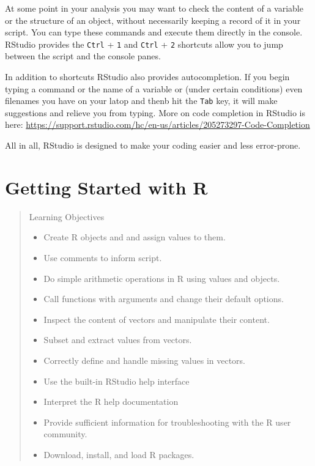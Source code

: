 \documentclass[
]{book}
\providecommand{\tightlist}{%
  \setlength{\itemsep}{0pt}\setlength{\parskip}{0pt}}
\begin{document}
At some point in your analysis you may want to check the content of a variable
or the structure of an object, without necessarily keeping a record of it in
your script. You can type these commands and execute them directly in the
console. RStudio provides the \texttt{Ctrl} + \texttt{1} and
\texttt{Ctrl} + \texttt{2} shortcuts allow you to jump between the
script and the console panes.

In addition to shortcuts RStudio also provides autocompletion. If you begin typing a command or the name of a variable or (under certain conditions) even filenames you have on your latop and thenb hit the \texttt{Tab} key, it will make suggestions and relieve you from typing. More on code completion in RStudio is here: \url{https://support.rstudio.com/hc/en-us/articles/205273297-Code-Completion}

All in all, RStudio is designed to make your coding easier and less error-prone.

\hypertarget{gettingstarted}{%
\chapter{Getting Started with R}\label{gettingstarted}}

\begin{quote}
Learning Objectives

\begin{itemize}
\tightlist
\item
  Create R objects and and assign values to them.
\item
  Use comments to inform script.
\item
  Do simple arithmetic operations in R using values and objects.
\item
  Call functions with arguments and change their default options.
\item
  Inspect the content of vectors and manipulate their content.
\item
  Subset and extract values from vectors.
\item
  Correctly define and handle missing values in vectors.
\item
  Use the built-in RStudio help interface
\item
  Interpret the R help documentation
\item
  Provide sufficient information for troubleshooting with the R user community.
\item
  Download, install, and load R packages.
\end{itemize}
\end{quote}
\end{document}
